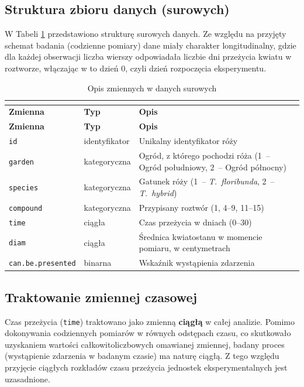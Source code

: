 \documentclass[12pt, a4paper]{article}
\begin{document}
\subsection{Struktura zbioru danych (surowych)}
W Tabeli \ref{tab:raw_data_variables} przedstawiono strukturę surowych danych. Ze względu na przyjęty schemat badania (codzienne pomiary) dane miały charakter longitudinalny, gdzie dla każdej obserwacji liczba wierszy odpowiadała liczbie dni przeżycia kwiatu w roztworze, włączając w to dzień 0, czyli dzień rozpoczęcia eksperymentu. 
\begin{longtable}{llp{7cm}}
\caption{Opis zmiennych w danych surowych}\\
\label{tab:raw_data_variables}\\
\toprule
\textbf{Zmienna} & \textbf{Typ} & \textbf{Opis} \\
\midrule
\endfirsthead
\toprule
\textbf{Zmienna} & \textbf{Typ} & \textbf{Opis} \\
\midrule
\endhead
\bottomrule
\endfoot
\texttt{id}                & identyfikator & Unikalny identyfikator róży \\
\texttt{garden}            & kategoryczna & Ogród, z którego pochodzi róża \newline (1~-- Ogród południowy, 2~-- Ogród północny)\\
\texttt{species}           & kategoryczna & Gatunek róży \newline (1~-- \textit{T.~floribunda}, 2~-- \textit{T.~hybrid})\\
\texttt{compound}          & kategoryczna & Przypisany roztwór (1, 4--9, 11--15) \\
\texttt{time}              & ciągła & Czas przeżycia w dniach (0--30) \\
\texttt{diam}              & ciągła & Średnica kwiatostanu w momencie pomiaru, w centymetrach\\
\texttt{can.be.presented}  & binarna & Wskaźnik wystąpienia zdarzenia\\
\end{longtable}


\subsection{Traktowanie zmiennej czasowej}
Czas przeżycia (\texttt{time}) traktowano jako zmienną \textbf{ciągłą} w całej analizie. Pomimo dokonywania codziennych pomiarów w równych odstępach czasu, co skutkowało uzyskaniem wartości całkowitoliczbowych omawianej zmiennej, badany proces (wystąpienie zdarzenia w badanym czasie) ma naturę ciągłą. Z tego względu przyjęcie ciągłych rozkładów czasu przeżycia jednostek eksperymentalnych jest uzasadnione.
\end{document}
